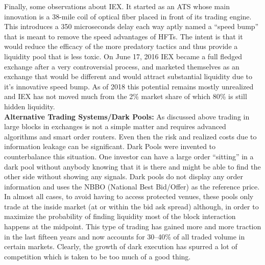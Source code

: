 Finally, some observations about IEX. It started as an ATS whose main innovation is a 38-mile coil of optical fiber placed in front of its trading engine. This introduces a 350 microseconds delay each way aptly named a ``speed bump'' that is meant to remove the speed advantages of HFTs. The intent is that it would reduce the efficacy of the more predatory tactics and thus provide a liquidity pool that is less toxic. On June 17, 2016 IEX became a full fledged exchange after a very controversial process, and marketed themselves as an exchange that would be different and would attract substantial liquidity due to it's innovative speed bump. As of 2018 this potential remains mostly unrealized and IEX has not moved much from the 2\% market share of which 80\% is still hidden liquidity. \\



\noindent\textbf{Alternative Trading Systems/Dark Pools:} As discussed above trading in large blocks in exchanges is not a simple matter and requires advanced algorithms and smart order routers. Even then the risk and realized costs due to information leakage can be significant. Dark Pools were invented to counterbalance this situation. One investor can have a large order ``sitting'' in a dark pool without anybody knowing that it is there and might be able to find the other side without showing any signals. Dark pools do not display any order information and uses the NBBO (National Best Bid/Offer) as the reference price. In almost all cases, to avoid having to access protected venues, these pools only trade at the inside market (at or within the bid ask spread) although, in order to maximize the probability of finding liquidity most of the block interaction happens at the midpoint. This type of trading has gained more and more traction in the last fifteen years and now accounts for 30--40\% of all traded volume in certain markets. Clearly, the growth of dark execution has spurred a lot of competition which is taken to be too much of a good thing. 


